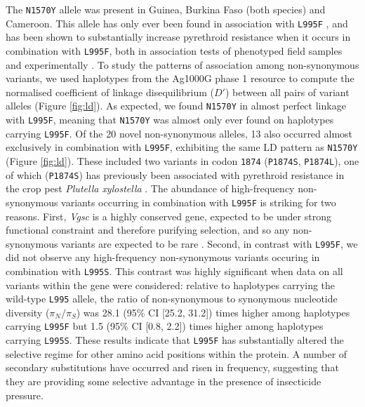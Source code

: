 \documentclass[a4paper,11pt,abstracton,hidelinks]{scrartcl}
\begin{document}
%
The \texttt{N1570Y} allele was present in Guinea, Burkina Faso (both species) and Cameroon.
%
This allele has only ever been found in association with \texttt{L995F} \cite{Jones2012}, and has been shown to substantially increase pyrethroid resistance when it occurs in combination with \texttt{L995F}, both in association tests of phenotyped field samples \cite{Jones2012} and experimentally \cite{Wang2015}.
%
To study the patterns of association among non-synonymous variants, we used haplotypes from the Ag1000G phase 1 resource to compute the normalised coefficient  of linkage disequilibrium ($D'$) between all pairs of variant alleles (Figure \ref{fig:ld}).
%
As expected, we found \texttt{N1570Y} in almost perfect linkage with \texttt{L995F}, meaning that \texttt{N1570Y} was almost only ever found on haplotypes carrying \texttt{L995F}.
%
Of the 20 novel non-synonymous alleles, 13 also occurred almost exclusively in combination with \texttt{L995F}, exhibiting the same LD pattern as \texttt{N1570Y} (Figure \ref{fig:ld}).
%
These included two variants in codon \texttt{1874} (\texttt{P1874S}, \texttt{P1874L}), one of which (\texttt{P1874S}) has previously been associated with pyrethroid resistance in the crop pest \textit{Plutella xylostella} \cite{Sonoda2008}.
%
The abundance of high-frequency non-synonymous variants occurring in combination with \texttt{L995F} is striking for two reasons.
%
First, \textit{Vgsc} is a highly conserved gene, expected to be under strong functional constraint and therefore purifying selection, and so any non-synonymous variants are expected to be rare \cite{Davies2007b}.
%
Second, in contrast with \texttt{L995F}, we did not observe any high-frequency non-synonymous variants occuring in combination with \texttt{L995S}.
%
This contrast was highly significant when data on all variants within the gene were considered: relative to haplotypes carrying the wild-type \texttt{L995} allele, the ratio of non-synonymous to synonymous nucleotide diversity ($\pi_{N}/\pi_{S}$) was 28.1 (95\% CI [25.2, 31.2]) times higher among haplotypes carrying \texttt{L995F} but 1.5 (95\% CI [0.8, 2.2]) times higher among haplotypes carrying \texttt{L995S}.
%
These results indicate that \texttt{L995F} has substantially altered the selective regime for other amino acid positions within the protein.
%
A number of secondary substitutions have occurred and risen in frequency, suggesting that they are providing some selective advantage in the presence of insecticide pressure.
\end{document}
